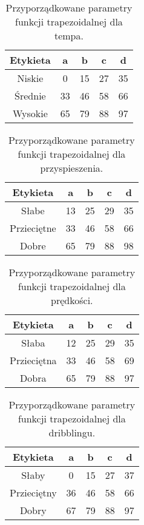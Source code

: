 \documentclass{classrep}
\begin{document}
\begin{table}[H]
	\centering
	\begin{tabular}{c c c c c} 
		\hline
		\textbf{Etykieta} & \textbf{a} & \textbf{b} & \textbf{c} &  \textbf{d} \\ [0.5ex] 
		\hline
		\hline 
		Niskie & 0 & 15 & 27 & 35 \\ 
		Średnie & 33 & 46 & 58 & 66 \\
		Wysokie & 65 & 79 & 88 & 97 \\
		\hline
	\end{tabular}
	\caption{Przyporządkowane parametry funkcji trapezoidalnej dla tempa.}
\end{table}

\begin{table}[H]
	\centering
	\begin{tabular}{c c c c c} 
		\hline
		\textbf{Etykieta} & \textbf{a} & \textbf{b} & \textbf{c} &  \textbf{d} \\ [0.5ex] 
		\hline
		\hline 
		Słabe & 13 & 25 & 29 & 35 \\ 
		Przieciętne & 33 & 46 & 58 & 66 \\
		Dobre & 65 & 79 & 88 & 98 \\
		\hline
	\end{tabular}
	\caption{Przyporządkowane parametry funkcji trapezoidalnej dla przyspieszenia.}
\end{table}

\begin{table}[H]
	\centering
	\begin{tabular}{c c c c c} 
		\hline
		\textbf{Etykieta} & \textbf{a} & \textbf{b} & \textbf{c} &  \textbf{d} \\ [0.5ex] 
		\hline
		\hline 
		Słaba & 12 & 25 & 29 & 35 \\ 
		Przieciętna & 33 & 46 & 58 & 69 \\
		Dobra & 65 & 79 & 88 & 97 \\
		\hline
	\end{tabular}
	\caption{Przyporządkowane parametry funkcji trapezoidalnej dla prędkości.}
\end{table}

\begin{table}[H]
	\centering
	\begin{tabular}{c c c c c} 
		\hline
		\textbf{Etykieta} & \textbf{a} & \textbf{b} & \textbf{c} &  \textbf{d} \\ [0.5ex] 
		\hline
		\hline 
		Słaby & 0 & 15 & 27 & 37 \\ 
		Przieciętny & 36 & 46 & 58 & 66 \\
		Dobry & 67 & 79 & 88 & 97 \\
		\hline
	\end{tabular}
	\caption{Przyporządkowane parametry funkcji trapezoidalnej dla dribblingu.}
\end{table}
\end{document}
